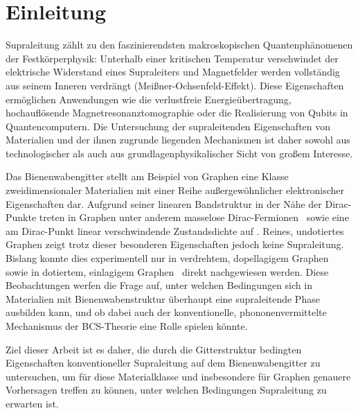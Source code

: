 \chapter{Einleitung}\label{sec:einleitung}

Supraleitung zählt zu den faszinierendsten makroskopischen Quantenphänomenen der Festkörperphysik: Unterhalb einer kritischen Temperatur verschwindet der elektrische Widerstand eines Supraleiters und Magnetfelder werden vollständig aus seinem Inneren verdrängt (Meißner-Ochsenfeld-Effekt). 
Diese Eigenschaften ermöglichen Anwendungen wie die verlustfreie Energieübertragung, hochauflösende Magnetresonanztomographie oder die Realisierung von Qubits in Quantencomputern. 
Die Untersuchung der supraleitenden Eigenschaften von Materialien und der ihnen zugrunde liegenden Mechanismen ist daher sowohl aus technologischer als auch aus grundlagenphysikalischer Sicht von großem Interesse.

Das Bienenwabengitter stellt am Beispiel von Graphen eine Klasse zweidimensionaler
Materialien mit einer Reihe außergewöhnlicher elektronischer Eigenschaften dar. 
Aufgrund seiner linearen Bandstruktur in der Nähe der Dirac-Punkte treten in Graphen unter anderem masselose Dirac-Fermionen~\cite{semenoff_condensed-matter_1984,novoselov_two-dimensional_2005} sowie eine am Dirac-Punkt linear verschwindende Zustandsdichte auf \cite{castro_neto_electronic_2009}. 
Reines, undotiertes Graphen zeigt trotz dieser besonderen Eigenschaften jedoch keine Supraleitung. 
Bislang konnte dies experimentell nur in verdrehtem, dopellagigem Graphen~\cite{cao_unconventional_2018} sowie in dotiertem, einlagigem Graphen~\cite{ludbrook_evidence_2015} direkt nachgewiesen werden. 
Diese Beobachtungen werfen die Frage auf, unter welchen Bedingungen sich in Materialien mit Bienenwabenstruktur überhaupt eine supraleitende Phase ausbilden kann, und ob dabei auch der konventionelle, phononenvermittelte Mechanismus der BCS-Theorie eine Rolle spielen könnte.

Ziel dieser Arbeit ist es daher, die durch die Gitterstruktur bedingten Eigenschaften konventioneller Supraleitung auf dem Bienenwabengitter zu untersuchen, um für diese Materialklasse und insbesondere für Graphen genauere Vorhersagen treffen zu können, unter welchen Bedingungen Supraleitung zu erwarten ist.

